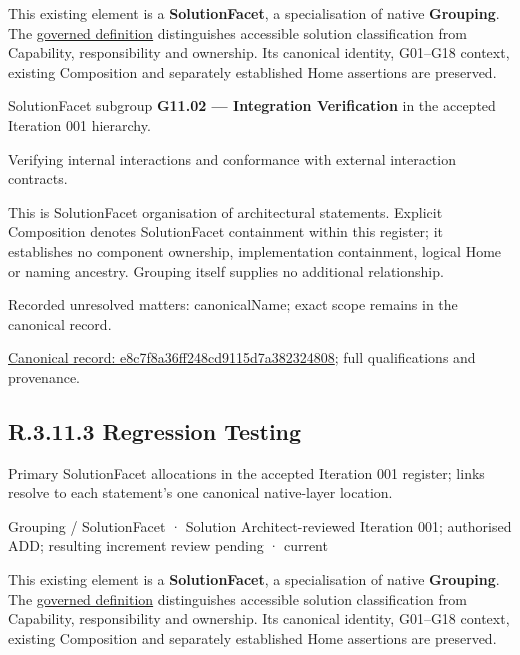 This existing element is a \textbf{SolutionFacet}, a specialisation of native
\textbf{Grouping}. The \href{\detokenize{../../../../../../../governance/continuum-representation.md#solutionfacet-classification--1119-candidate}}{governed definition}
distinguishes accessible solution classification from Capability, responsibility
and ownership. Its canonical identity, G01–G18 context, existing Composition
and separately established Home assertions are preserved.



SolutionFacet subgroup \textbf{G11.02 — Integration Verification} in the accepted Iteration 001 hierarchy.



Verifying internal interactions and conformance with external interaction contracts.



This is SolutionFacet organisation of architectural statements. Explicit Composition denotes SolutionFacet containment within this register; it establishes no component ownership, implementation containment, logical Home or naming ancestry. Grouping itself supplies no additional relationship.


{\small Recorded unresolved matters: canonicalName; exact scope remains in the canonical record.}\par
{\footnotesize \href{../../../../../../../continuum/grouping/e8c7f8a36ff248cd9115d7a382324808.md}{Canonical record: e8c7f8a36ff248cd9115d7a382324808}; full qualifications and provenance.}\par
\subsection*{R.3.11.3 Regression Testing}
\label{navigation:R.3.11.3}

Primary SolutionFacet allocations in the accepted Iteration 001 register; links resolve to each statement’s one canonical native-layer location.\par
\label{element:35df8a5d8b1e495ba4cf79a5d4a47863}
{\small Grouping / SolutionFacet · Solution Architect-reviewed Iteration 001; authorised ADD; resulting increment review pending · current}\par

This existing element is a \textbf{SolutionFacet}, a specialisation of native
\textbf{Grouping}. The \href{\detokenize{../../../../../../../governance/continuum-representation.md#solutionfacet-classification--1119-candidate}}{governed definition}
distinguishes accessible solution classification from Capability, responsibility
and ownership. Its canonical identity, G01–G18 context, existing Composition
and separately established Home assertions are preserved.



